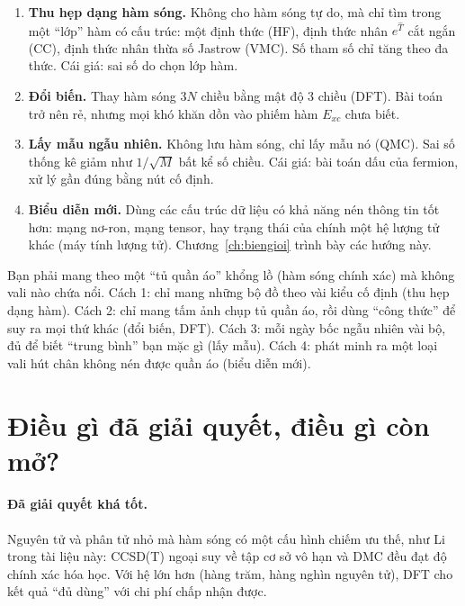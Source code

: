 \begin{enumerate}
\item \textbf{Thu hẹp dạng hàm sóng.} Không cho hàm sóng tự do, mà chỉ tìm trong một ``lớp'' hàm có cấu trúc: một định thức (HF), định thức nhân $e^{\hat T}$ cắt ngắn (CC), định thức nhân thừa số Jastrow (VMC). Số tham số chỉ tăng theo đa thức. Cái giá: sai số do chọn lớp hàm.
\item \textbf{Đổi biến.} Thay hàm sóng $3N$ chiều bằng mật độ 3 chiều (DFT). Bài toán trở nên rẻ, nhưng mọi khó khăn dồn vào phiếm hàm $E_{xc}$ chưa biết.
\item \textbf{Lấy mẫu ngẫu nhiên.} Không lưu hàm sóng, chỉ lấy mẫu nó (QMC). Sai số thống kê giảm như $1/\sqrt M$ bất kể số chiều. Cái giá: bài toán dấu của fermion, xử lý gần đúng bằng nút cố định.
\item \textbf{Biểu diễn mới.} Dùng các cấu trúc dữ liệu có khả năng nén thông tin tốt hơn: mạng nơ-ron, mạng tensor, hay trạng thái của chính một hệ lượng tử khác (máy tính lượng tử). Chương~\ref{ch:biengioi} trình bày các hướng này.
\end{enumerate}

\begin{eli5}
Bạn phải mang theo một ``tủ quần áo'' khổng lồ (hàm sóng chính xác) mà không vali nào chứa nổi. Cách 1: chỉ mang những bộ đồ theo vài kiểu cố định (thu hẹp dạng hàm). Cách 2: chỉ mang tấm ảnh chụp tủ quần áo, rồi dùng ``công thức'' để suy ra mọi thứ khác (đổi biến, DFT). Cách 3: mỗi ngày bốc ngẫu nhiên vài bộ, đủ để biết ``trung bình'' bạn mặc gì (lấy mẫu). Cách 4: phát minh ra một loại vali hút chân không nén được quần áo (biểu diễn mới).
\end{eli5}

\section{Điều gì đã giải quyết, điều gì còn mở?}

\paragraph{Đã giải quyết khá tốt.}
Nguyên tử và phân tử nhỏ mà hàm sóng có một cấu hình chiếm ưu thế, như Li trong tài liệu này: CCSD(T) ngoại suy về tập cơ sở vô hạn và DMC đều đạt độ chính xác hóa học. Với hệ lớn hơn (hàng trăm, hàng nghìn nguyên tử), DFT cho kết quả ``đủ dùng'' với chi phí chấp nhận được.

